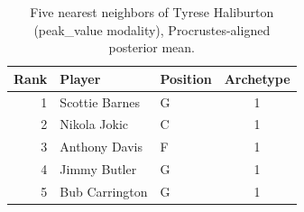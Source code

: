 \begin{table}[htbp]
  \centering\small
  \begin{tabular}{rllc}
    \toprule
    Rank & Player & Position & Archetype \\
    \midrule
    1 & Scottie Barnes & G & 1 \\
    2 & Nikola Jokic & C & 1 \\
    3 & Anthony Davis & F & 1 \\
    4 & Jimmy Butler & G & 1 \\
    5 & Bub Carrington & G & 1 \\
    \bottomrule
  \end{tabular}
  \caption{Five nearest neighbors of Tyrese Haliburton (peak_value modality), Procrustes-aligned posterior mean.}
  \label{tab:Tyrese_Haliburton_neighbors_peak_value}
\end{table}


